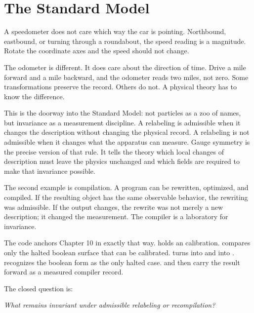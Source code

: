 \chapter{The Standard Model}
\label{chap:the-standard-model}


\begin{chapteressay}

A speedometer does not care which way the car is pointing. Northbound,
eastbound, or turning through a roundabout, the speed reading is a magnitude.
Rotate the coordinate axes and the speed should not change.

The odometer is different. It does care about the direction of time. Drive a
mile forward and a mile backward, and the odometer reads two miles, not zero.
Some transformations preserve the record. Others do not. A physical theory has
to know the difference.

This is the doorway into the Standard Model: not particles as a zoo of names,
but invariance as a measurement discipline. A relabeling is admissible when it
changes the description without changing the physical record. A relabeling is
not admissible when it changes what the apparatus can measure. Gauge symmetry
is the precise version of that rule. It tells the theory which local changes of
description must leave the physics unchanged and which fields are required to
make that invariance possible.

The second example is compilation. A program can be rewritten, optimized, and
compiled. If the resulting object has the same observable behavior, the
rewriting was admissible. If the output changes, the rewrite was not merely a
new description; it changed the measurement. The compiler is a laboratory for
invariance.

The code anchors Chapter 10 in exactly that way.  holds an
 calibration.  compares only the halted
boolean surface that can be calibrated.  turns
 into  and  into .
 recognizes the boolean form as the only halted case.
 and  then carry the result forward as a measured
compiler record.

The closed question is:

\begin{center}
\emph{What remains invariant under admissible relabeling or recompilation?}
\end{center}


\end{chapteressay}

